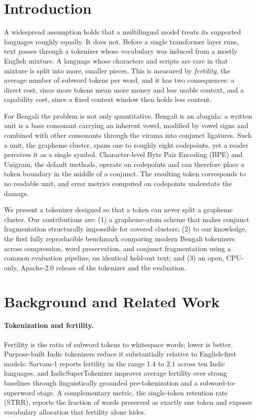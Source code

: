 \documentclass[11pt]{article}
\begin{document}
\section{Introduction}
A widespread assumption holds that a multilingual model treats its supported
languages roughly equally. It does not. Before a single transformer layer runs,
text passes through a tokenizer whose vocabulary was induced from a mostly
English mixture. A language whose characters and scripts are rare in that mixture
is split into more, smaller pieces. This is measured by \emph{fertility}, the
average number of subword tokens per word, and it has two consequences: a direct
cost, since more tokens mean more money and less usable context, and a capability
cost, since a fixed context window then holds less content.

For Bengali the problem is not only quantitative. Bengali is an abugida: a
written unit is a base consonant carrying an inherent vowel, modified by vowel
signs and combined with other consonants through the virama into conjunct
ligatures. Such a unit, the grapheme cluster, spans one to roughly eight
codepoints, yet a reader perceives it as a single symbol. Character-level Byte
Pair Encoding (BPE) and Unigram, the default methods, operate on codepoints and
can therefore place a token boundary in the middle of a conjunct. The resulting
token corresponds to no readable unit, and error metrics computed on codepoints
understate the damage.

We present a tokenizer designed so that a token can never split a grapheme
cluster. Our contributions are: (1) a grapheme-atom scheme that makes conjunct
fragmentation structurally impossible for covered clusters; (2) to our
knowledge, the first fully reproducible benchmark comparing modern Bengali
tokenizers across compression, word preservation, and conjunct fragmentation
using a common evaluation pipeline, on identical held-out text; and (3) an
open, CPU-only, Apache-2.0 release of the tokenizer and the evaluation.

\section{Background and Related Work}
\paragraph{Tokenization and fertility.} Fertility is the ratio of subword tokens
to whitespace words; lower is better. Purpose-built Indic tokenizers reduce it
substantially relative to English-first models: Sarvam-1 reports fertility in the
range $1.4$ to $2.1$ across ten Indic languages, and IndicSuperTokenizer improves
average fertility over strong baselines through linguistically grounded
pre-tokenization and a subword-to-superword stage. A complementary metric, the
single-token retention rate (STRR), reports the fraction of words preserved as
exactly one token and exposes vocabulary allocation that fertility alone hides.
\end{document}
